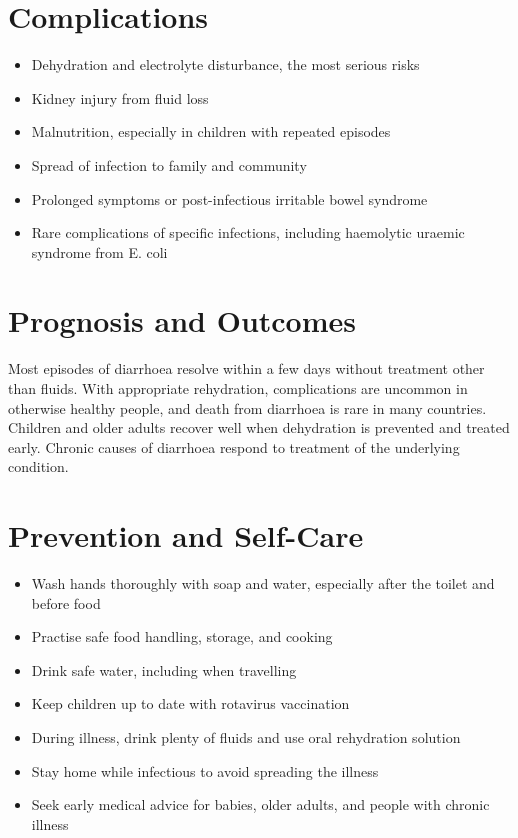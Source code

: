 \section*{Complications}
\begin{itemize}
    \item Dehydration and electrolyte disturbance, the most serious risks
    \item Kidney injury from fluid loss
    \item Malnutrition, especially in children with repeated episodes
    \item Spread of infection to family and community
    \item Prolonged symptoms or post-infectious irritable bowel syndrome
    \item Rare complications of specific infections, including haemolytic uraemic syndrome from E. coli
\end{itemize}

\section*{Prognosis and Outcomes}
Most episodes of diarrhoea resolve within a few days without treatment other than fluids. With appropriate rehydration, complications are uncommon in otherwise healthy people, and death from diarrhoea is rare in many countries. Children and older adults recover well when dehydration is prevented and treated early. Chronic causes of diarrhoea respond to treatment of the underlying condition.

\section*{Prevention and Self-Care}
\begin{itemize}
    \item Wash hands thoroughly with soap and water, especially after the toilet and before food
    \item Practise safe food handling, storage, and cooking
    \item Drink safe water, including when travelling
    \item Keep children up to date with rotavirus vaccination
    \item During illness, drink plenty of fluids and use oral rehydration solution
    \item Stay home while infectious to avoid spreading the illness
    \item Seek early medical advice for babies, older adults, and people with chronic illness
\end{itemize}

